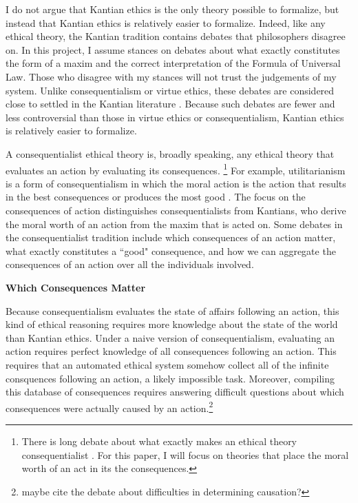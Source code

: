 \begin{isabellebody}
\begin{isamarkuptext}
I do not argue that Kantian ethics is the only theory possible to formalize, but instead that Kantian
ethics is relatively easier to formalize. Indeed, like any ethical theory, the Kantian tradition contains 
debates that philosophers disagree on. In this project, I assume stances on debates about
what exactly constitutes the form of a maxim and the correct interpretation of the Formula of 
Universal Law. Those who disagree with my stances will not trust the judgements of my system. Unlike
consequentialism or virtue ethics, these debates are considered close to settled in the Kantian literature 
\cite{ebelsduggan}. Because such debates are fewer and less controversial than those in virtue ethics
or consequentialism, Kantian ethics is relatively easier to formalize.%
\end{isamarkuptext}\isamarkuptrue%
%
\isadelimdocument
%
\endisadelimdocument
%
\isatagdocument
%
\isamarkuptrue%
%
\endisatagdocument
{\isafolddocument}%
%
\isadelimdocument
%
\endisadelimdocument
%
\begin{isamarkuptext}%
A consequentialist ethical theory is, broadly speaking, any ethical theory that evaluates an action by evaluating 
its consequences. \footnote{There is long debate about what exactly makes an ethical theory consequentialist \cite{consequentialismsep}. 
For this paper, I will focus on theories that place the moral worth of an act in its the consequences.} For example, 
utilitarianism is a form of consequentialism in which the moral action 
is the action that results in the best consequences or produces the most good \cite{utilsep}. The focus
on the consequences of action distinguishes consequentialists from Kantians, who derive the moral worth
of an action from the maxim that is acted on. Some debates in the consequentialist tradition include 
which consequences of an action matter, what exactly constitutes a ``good" consequence, and how we can 
aggregate the consequences of an action over all the individuals involved.%
\end{isamarkuptext}\isamarkuptrue%
%
\begin{isamarkuptext}%
\textbf{Which Consequences Matter}%
\end{isamarkuptext}\isamarkuptrue%
%
\begin{isamarkuptext}%
Because consequentialism evaluates the state of affairs following an action, this kind of ethical 
reasoning requires more knowledge
about the state of the world than Kantian ethics. Under a naive version of consequentialism, evaluating 
an action requires perfect knowledge of all consequences following an action. This requires that an 
automated ethical system somehow collect all of the infinite consquences following an action, a likely
impossible task. Moreover, compiling this database of consequences requires 
answering difficult questions about which consequences were actually caused by an action.\footnote
{maybe cite the debate about difficulties in determining causation?}


\end{isamarkuptext}
\end{isabellebody}
